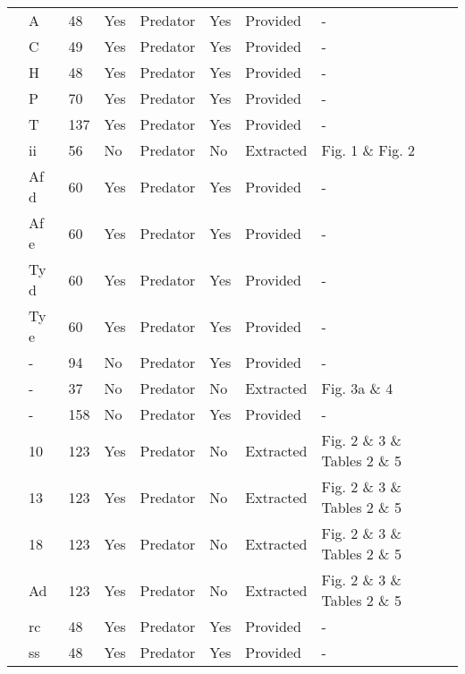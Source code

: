 \begin{longtable}{lllllllll}
\citet{Kalinkat:2011bd}&A&48&Yes&Predator&Yes&Provided&-&\citet{Kalinkat:2018aa}\tabularnewline
\citet{Kalinkat:2011bd}&C&49&Yes&Predator&Yes&Provided&-&\citet{Kalinkat:2018aa}\tabularnewline
\citet{Kalinkat:2011bd}&H&48&Yes&Predator&Yes&Provided&-&\citet{Kalinkat:2018aa}\tabularnewline
\citet{Kalinkat:2011bd}&P&70&Yes&Predator&Yes&Provided&-&\citet{Kalinkat:2018aa}\tabularnewline
\citet{Kalinkat:2011bd}&T&137&Yes&Predator&Yes&Provided&-&\citet{Kalinkat:2018aa}\tabularnewline
\citet{Krylov:1992aa}&ii&56&No&Predator&No&Extracted&Fig. 1 \& Fig. 2&\citet{Novak:2020aa}\tabularnewline
\citet{Lester:2002aa}&Af d&60&Yes&Predator&Yes&Provided&-&\citet{Lester:2020aa}\tabularnewline
\citet{Lester:2002aa}&Af e&60&Yes&Predator&Yes&Provided&-&\citet{Lester:2020aa}\tabularnewline
\citet{Lester:2002aa}&Ty d&60&Yes&Predator&Yes&Provided&-&\citet{Lester:2020aa}\tabularnewline
\citet{Lester:2002aa}&Ty e&60&Yes&Predator&Yes&Provided&-&\citet{Lester:2020aa}\tabularnewline
\citet{Long:2012ab}&-&94&No&Predator&Yes&Provided&-&\citet{Long:2020ab}\tabularnewline
\citet{Mattila:1998aa}&-&37&No&Predator&No&Extracted&Fig. 3a \& 4&\citet{Novak:2020aa}\tabularnewline
\citet{Nachappa:2006aa}&-&158&No&Predator&Yes&Provided&-&\tabularnewline
\citet{Ranta:1985aa}&10&123&Yes&Predator&No&Extracted&Fig. 2 \& 3 \& Tables 2 \& 5&\citet{Novak:2020aa}\tabularnewline
\citet{Ranta:1985aa}&13&123&Yes&Predator&No&Extracted&Fig. 2 \& 3 \& Tables 2 \& 5&\citet{Novak:2020aa}\tabularnewline
\citet{Ranta:1985aa}&18&123&Yes&Predator&No&Extracted&Fig. 2 \& 3 \& Tables 2 \& 5&\citet{Novak:2020aa}\tabularnewline
\citet{Ranta:1985aa}&Ad&123&Yes&Predator&No&Extracted&Fig. 2 \& 3 \& Tables 2 \& 5&\citet{Novak:2020aa}\tabularnewline
\citet{Wong:2005aa}&rc&48&Yes&Predator&Yes&Provided&-&\citet{Wong:2020ab}\tabularnewline
\citet{Wong:2005aa}&ss&48&Yes&Predator&Yes&Provided&-&\citet{Wong:2020ab}\tabularnewline
\hline
\end{longtable}
